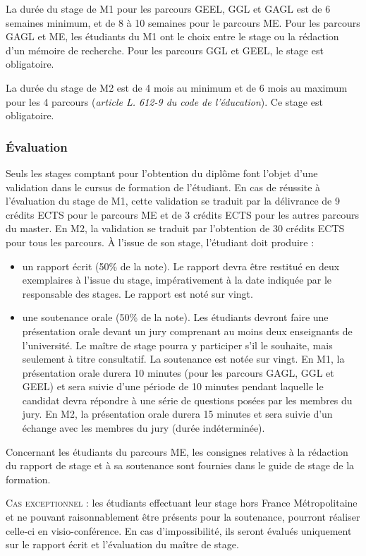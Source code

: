 \documentclass[a4paper,11pt]{article}
\begin{document}
La durée du stage de M1 pour les parcours GEEL, GGL et GAGL est de 6 semaines minimum, et de 8 à 10 semaines pour le parcours ME. Pour les parcours GAGL et ME, les étudiants du M1 ont le choix entre le stage ou la rédaction d'un mémoire de recherche. Pour les parcours GGL et GEEL, le stage est obligatoire. 

La durée du stage de M2 est de 4 mois au minimum et de 6 mois au maximum pour les 4 parcours (\emph{article L. 612-9 du code de l'éducation}). Ce stage est obligatoire.

\subsubsection{Évaluation}
Seuls les stages comptant pour l'obtention du diplôme font l'objet d'une validation dans le cursus de formation de l'étudiant. En cas de réussite à l'évaluation du stage de M1, cette validation se traduit par la délivrance de 9 crédits ECTS pour le parcours ME et de 3 crédits ECTS pour les autres parcours du master. En M2, la validation se traduit par l'obtention de 30 crédits ECTS pour tous les parcours. À l'issue de son stage, l'étudiant doit produire :
\begin{itemize}
	\item un rapport écrit (50\% de la note). Le rapport devra être restitué en deux exemplaires à l'issue du stage, impérativement à la date indiquée par le responsable des stages. Le rapport est noté sur vingt.
	\item une soutenance orale (50\% de la note). Les étudiants devront faire une présentation orale devant un jury comprenant au moins deux enseignants de l'université. Le maître de stage pourra y participer s'il le souhaite, mais seulement à titre consultatif. La soutenance est notée sur vingt. En M1, la présentation orale durera 10 minutes (pour les parcours GAGL, GGL et GEEL) et sera suivie d'une période de 10 minutes pendant laquelle le candidat devra répondre à une série de questions posées par les membres du jury. En M2, la présentation orale durera 15 minutes et sera suivie d'un échange avec les membres du jury (durée indéterminée).
\end{itemize}

Concernant les étudiants du parcours ME, les consignes relatives à la rédaction du rapport de stage et à sa soutenance sont fournies dans le guide de stage de la formation.

\textsc{Cas exceptionnel} : les étudiants effectuant leur stage hors France Métropolitaine et ne pouvant raisonnablement être présents pour la soutenance, pourront réaliser celle-ci en visio-conférence. En cas d'impossibilité, ils seront évalués uniquement sur le rapport écrit et l'évaluation du maître de stage.
\end{document}
